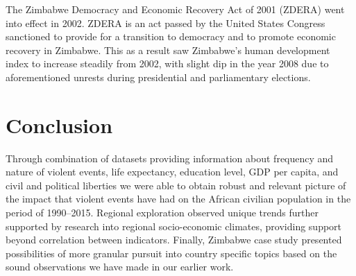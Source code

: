\documentclass[a4paper,11pt]{article}
\begin{document}
The Zimbabwe Democracy and Economic Recovery Act of 2001 (ZDERA) went into effect in 2002. ZDERA is an act passed by the United States Congress sanctioned to provide for a transition to democracy and to promote economic recovery in Zimbabwe. This as a result saw Zimbabwe’s human development index to increase steadily from 2002, with slight dip in the year 2008 due to aforementioned unrests during presidential and parliamentary elections.

\section{Conclusion}

Through combination of datasets providing information about frequency and nature of violent events, life expectancy, education level, GDP per capita, and civil and political liberties we were able to obtain robust and relevant picture of the impact that violent events have had on the African civilian population in the period of 1990--2015. Regional exploration observed unique trends further supported by research into regional socio-economic climates, providing support beyond correlation between indicators. Finally, Zimbabwe case study presented possibilities of more granular pursuit into country specific topics based on the sound observations we have made in our earlier work.


\end{document}
